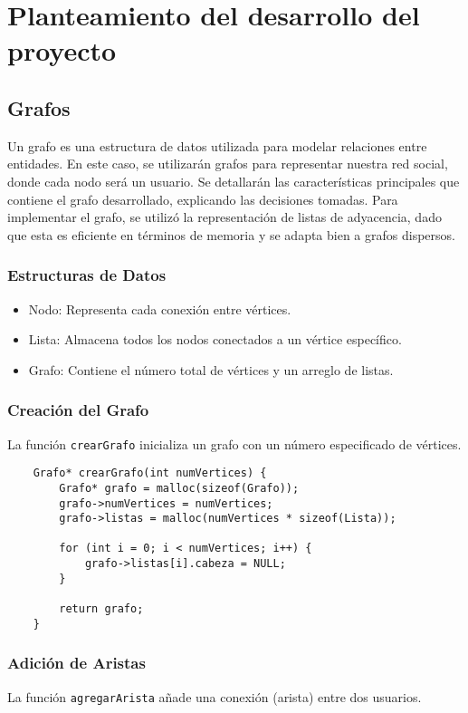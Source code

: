 \documentclass[9pt,letterpaper,onecolumn]{rho-class/rho}
\begin{document}
\newpage
\section{Planteamiento del desarrollo del proyecto}

    \subsection{Grafos}
    Un grafo es una estructura de datos utilizada para modelar relaciones entre entidades.
    En este caso, se utilizarán grafos para representar nuestra red social, donde cada nodo será un usuario.
    Se detallarán las características principales que contiene el grafo desarrollado, explicando las decisiones tomadas. 
    Para implementar el grafo, se utilizó la representación de listas de adyacencia, dado que esta es eficiente en términos de memoria y se adapta bien a grafos dispersos.

    \subsubsection{Estructuras de Datos}
    \begin{itemize}
        \item Nodo: Representa cada conexión entre vértices.
        \item Lista: Almacena todos los nodos conectados a un vértice específico.
        \item Grafo: Contiene el número total de vértices y un arreglo de listas.
    \end{itemize}

    \subsubsection{Creación del Grafo}
    La función \texttt{crearGrafo} inicializa un grafo con un número especificado de vértices.

    \begin{verbatim}
    Grafo* crearGrafo(int numVertices) {
        Grafo* grafo = malloc(sizeof(Grafo));
        grafo->numVertices = numVertices;
        grafo->listas = malloc(numVertices * sizeof(Lista));

        for (int i = 0; i < numVertices; i++) {
            grafo->listas[i].cabeza = NULL;
        }

        return grafo;
    }
    \end{verbatim}

    \subsubsection{Adición de Aristas}
    La función \texttt{agregarArista} añade una conexión (arista) entre dos usuarios.
\end{document}
